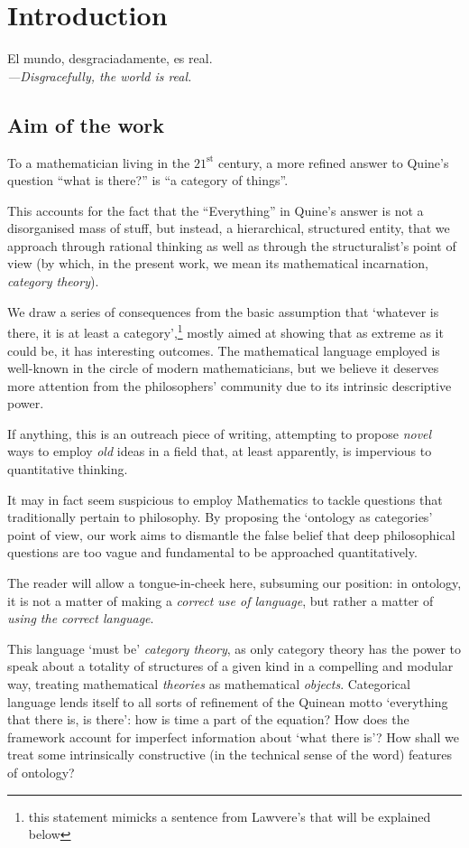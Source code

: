 \section{Introduction}\label{sec_intro}
\epigraph{El mundo, desgraciadamente, es real.\\[2mm]
\footnotesize\emph{---Disgracefully, the world is real.}
}{\cite{confutacion}}
\subsection{Aim of the work}
To a mathematician living in the $21^\text{st}$ century, a more refined answer to Quine's question \cite{quine1948there} ``what is there?'' is ``a category of things''. 

This accounts for the fact that the ``Everything'' in Quine's answer is not a disorganised mass of stuff, but instead, a hierarchical, structured entity, that we approach through rational thinking as well as through the structuralist's point of view (by which, in the present work, we mean its mathematical incarnation, \emph{category theory}).

We draw a series of consequences from the basic assumption that `whatever is there, it is at least a category',\footnote{this statement mimicks a sentence from Lawvere's \cite{lajolla} that will be explained below} mostly aimed at showing that as extreme as it could be, it has interesting outcomes. The mathematical language employed is well-known in the circle of modern mathematicians, but we believe it deserves more attention from the philosophers' community due to its intrinsic descriptive power. 

If anything, this is an outreach piece of writing, attempting to propose \emph{novel} ways to employ \emph{old} ideas in a field that, at least apparently, is impervious to quantitative thinking. 

It may in fact seem suspicious to employ Mathematics to tackle questions that traditionally pertain to philosophy. By proposing the `ontology as categories' point of view, our work aims to dismantle the false belief that deep philosophical questions are too vague and fundamental to be approached quantitatively.

The reader will allow a tongue-in-cheek here, subsuming our position: in ontology, it is not a matter of making a \emph{correct use of language}, but rather a matter of \emph{using the correct language}.

This language `must be' \emph{category theory}, as only category theory has the power to speak about a totality of structures of a given kind in a compelling and modular way, treating mathematical \emph{theories} as mathematical \emph{objects}. Categorical language lends itself to all sorts of refinement of the Quinean motto `everything that there is, is there': how is time a part of the equation? How does the framework account for imperfect information about `what there is'? How shall we treat some intrinsically constructive (in the technical sense of the word) features of ontology? 

